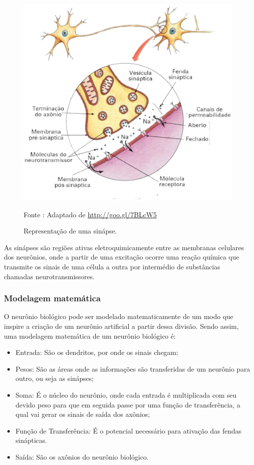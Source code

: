     \begin{figure}[ht]
        \centering
        \label{fig02}
            \includegraphics[keepaspectratio=true, scale=0.4]{editaveis/images/sinapse.eps}
        \caption{Representação de uma sinápse.}
        Fonte : Adaptado de \url{http://goo.gl/7BLcW5}
    \end{figure}

    As sinápses são regiões ativas eletroquimicamente entre as membranas celulares dos neurônios, onde a partir de uma excitação ocorre uma reação química que transmite os sinais de uma célula a outra por intermédio de substâncias chamadas neurotransmissores.

\subsubsection{Modelagem matemática}
    O neurônio biológico pode ser modelado matematicamente de um modo que inspire a criação de um neurônio artificial a partir dessa divisão. Sendo assim, uma modelagem matemática de um neurônio biológico é: \cite{rocha2006}

    \begin{itemize}
        \item Entrada: São os dendritos, por onde os sinais chegam;
        \item Pesos: São as áreas onde as informações são transferidas de um neurônio para outro,  ou seja as sinápses;
        \item Soma: É o núcleo do neurônio, onde cada entrada é multiplicada com seu devido peso para que em seguida passe por uma função de transferência, a qual vai gerar os sinais de saída dos axônios;
        \item Função de Transferência: É o potencial necessário para ativação das fendas sinápticas.
        \item Saída: São os axônios do neurônio biológico.
    \end{itemize}

